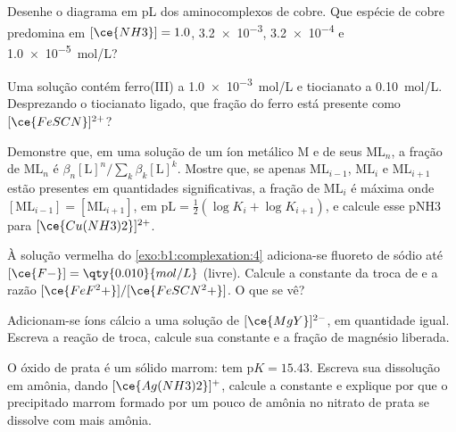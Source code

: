 \begin{exercise}[$\star$]\label{exo:b1:complexation:3}
Desenhe o diagrama em pL dos aminocomplexos de cobre. Que espécie de
cobre predomina em $[\ce{NH3}] = 1.0$, \num{3.2e-3}, \num{3.2e-4} e
\qty{1.0e-5}{mol/L}?
\end{exercise}

\begin{exercise}[$\star$]\label{exo:b1:complexation:4}
Uma solução contém ferro(III) a \qty{1.0e-3}{mol/L} e tiocianato a
\qty{0.10}{mol/L}. Desprezando o tiocianato ligado, que fração do ferro
está presente como $[\ce{FeSCN}]^{2+}$?
\end{exercise}

\begin{exercise}[$\star\star$]\label{exo:b1:complexation:5}
Demonstre que, em uma solução de um íon metálico M e de seus 
$\mathrm{ML}_n$, a fração de $\mathrm{ML}_n$ é
$\beta_n[\mathrm{L}]^n / \sum_{k} \beta_k[\mathrm{L}]^k$. Mostre que, se
apenas $\mathrm{ML}_{i-1}$, $\mathrm{ML}_i$ e $\mathrm{ML}_{i+1}$ estão
presentes em quantidades significativas, a fração de $\mathrm{ML}_i$ é
máxima onde $[\mathrm{ML}_{i-1}] = [\mathrm{ML}_{i+1}]$, em
$\mathrm{pL} = \frac12(\log K_i + \log K_{i+1})$, e calcule esse pNH3
para $[\ce{Cu(NH3)2}]^{2+}$.
\end{exercise}

\begin{exercise}[$\star\star$]\label{exo:b1:complexation:6}
À solução vermelha do \cref{exo:b1:complexation:4} adiciona-se fluoreto
de sódio até $[\ce{F-}] = \qty{0.010}{mol/L}$ (livre). Calcule a
constante da troca de  e a razão $[\ce{FeF^2+}]/[\ce{FeSCN^2+}]$.
O que se vê?
\end{exercise}

\begin{exercise}[$\star\star$]\label{exo:b1:complexation:7}
Adicionam-se íons cálcio a uma solução de $[\ce{MgY}]^{2-}$, em
quantidade igual. Escreva a reação de troca, calcule sua constante e a
fração de magnésio liberada.
\end{exercise}

\begin{exercise}[$\star\star$]\label{exo:b1:complexation:8}
O óxido de prata  é um sólido marrom: 
tem $\mathrm{p}K = 15.43$. Escreva sua dissolução em amônia, dando
$[\ce{Ag(NH3)2}]^{+}$, calcule a constante e explique por que o
precipitado marrom formado por um pouco de amônia no nitrato de prata se
dissolve com mais amônia.
\end{exercise}

